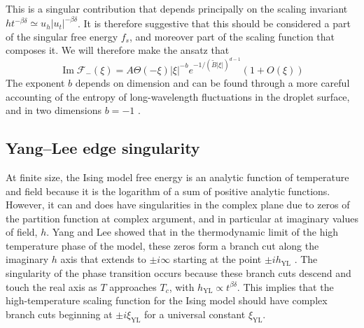 \documentclass[
  aps,
  pre,
  preprint,
  longbibliography,
  floatfix
]{revtex4-2}
\begin{document}
This is a singular contribution that depends principally on the scaling
invariant $ht^{-\beta\delta}\simeq u_h|u_t|^{-\beta\delta}$. It is therefore
suggestive that this should be considered a part of the singular free energy
$f_s$, and moreover part of the scaling function that composes it. We will
therefore make the ansatz that
\begin{equation} \label{eq:essential.singularity}
  \operatorname{Im}\mathcal F_-(\xi)=A\Theta(-\xi)|\xi|^{-b}e^{-1/(\tilde B|\xi|)^{d-1}}\left(1+O(\xi)\right)
\end{equation}
\cite{Houghton_1980_The}
The exponent $b$ depends on dimension and can be found through a more careful
accounting of the entropy of long-wavelength fluctuations in the droplet
surface, and in two dimensions $b=-1$ \cite{Gunther_1980_Goldstone}.

\subsection{Yang--Lee edge singularity}

At finite size, the Ising model free energy is an analytic function of
temperature and field because it is the logarithm of a sum of positive analytic
functions. However, it can and does have singularities in the complex plane due
to zeros of the partition function at complex argument, and in particular at
imaginary values of field, $h$. Yang and Lee showed that in the thermodynamic
limit of the high temperature phase of the model, these zeros form a branch cut
along the imaginary $h$ axis that extends to $\pm i\infty$ starting at the
point $\pm ih_{\mathrm{YL}}$ \cite{Yang_1952_Statistical, Lee_1952_Statistical}.
The singularity of the phase transition occurs because these branch cuts
descend and touch the real axis as $T$ approaches $T_c$, with
$h_{\mathrm{YL}}\propto t^{\beta\delta}$. This implies that the
high-temperature scaling function for the Ising model should have complex
branch cuts beginning at $\pm i\xi_{\mathrm{YL}}$ for a universal constant
$\xi_{\mathrm{YL}}$.
\end{document}
